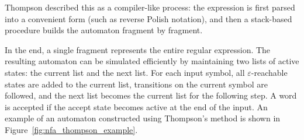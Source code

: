 Thompson described this as a compiler-like process: the expression is first parsed into a convenient form (such as reverse Polish notation), and then a stack-based procedure builds the automaton fragment by fragment.


In the end, a single fragment represents the entire regular expression. The resulting automaton can be simulated efficiently by maintaining two lists of active states: the current list and the next list. For each input symbol, all $\varepsilon$-reachable states are added to the current list, transitions on the current symbol are followed, and the next list becomes the current list for the following step. A word is accepted if the accept state becomes active at the end of the input. An example of an automaton constructed using Thompson's method is shown in Figure~\ref{fig:nfa_thompson_example}.

